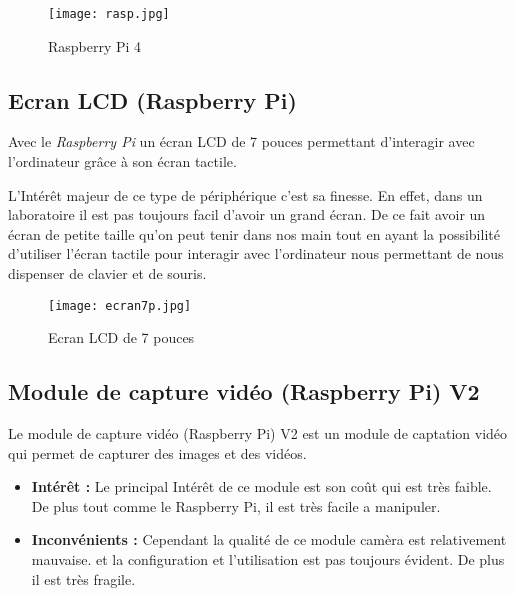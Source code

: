         \begin{figure}[ht]
            \centering
            \texttt{[image: rasp.jpg]}
            \caption{Raspberry Pi 4}
        \end{figure}
        
 
        \subsection{Ecran LCD (Raspberry Pi)}
        Avec le \textit{Raspberry Pi} un écran LCD de 7 pouces permettant d'interagir avec l'ordinateur grâce à son écran tactile. 

        \begin{flushleft}
            L'Intérêt majeur de ce type de périphérique c'est sa finesse.
            En effet, dans un laboratoire il est pas toujours facil d'avoir un grand écran.
            De ce fait avoir un écran de petite taille qu'on peut tenir dans nos main tout en ayant la possibilité d'utiliser l'écran tactile pour interagir avec l'ordinateur nous permettant de nous dispenser de clavier et de souris.
        \end{flushleft}

        \begin{figure}[ht]
            \centering
            \texttt{[image: ecran7p.jpg]} 
            \caption{Ecran LCD de 7 pouces}
        \end{figure}

        \vspace{1cm}

        \subsection{Module de capture vidéo (Raspberry Pi) V2}
        Le module de capture vidéo (Raspberry Pi) V2 est un module de captation vidéo qui permet de capturer des images et des vidéos.


        \begin{flushleft}
            \begin{itemize}
                \item \textbf{Intérêt :}
                Le principal Intérêt de ce module est son coût qui est très faible. De plus tout comme le Raspberry Pi, il est très facile a manipuler. 
                \item \textbf{Inconvénients :}
                Cependant la qualité de ce module camèra est relativement mauvaise. et la configuration et l'utilisation est pas toujours évident.
                De plus il est très fragile.
            \end{itemize}                
        \end{flushleft}

